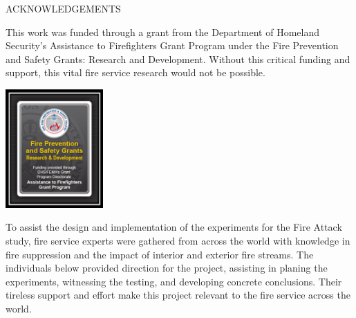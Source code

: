 \documentclass{article}
\begin{document}
\begin{center}
	ACKNOWLEDGEMENTS
\vspace*{\baselineskip}
\begin{adjustwidth}{-0.25in}{-0.25in}
This work was funded through a grant from the Department of Homeland Security's Assistance to Firefighters Grant Program under the Fire Prevention and Safety Grants: Research and Development. Without this critical funding and support, this vital fire service research would not be possible.

\vspace*{\baselineskip}

\begin{center}
	\includegraphics[width=0.28\textwidth]{Figures/General/DHS}
\end{center}

\clearpage

To assist the design and implementation of the experiments for the Fire Attack study, fire service experts were gathered from across the world with knowledge in fire suppression and the impact of interior and exterior fire streams. The individuals below provided direction for the project, assisting in planing the experiments, witnessing the testing, and developing concrete conclusions. Their tireless support and effort make this project relevant to the fire service across the world. 

\vspace*{\baselineskip}

\renewcommand{\arraystretch}{1.5}


\end{adjustwidth}
\end{center}
\end{document}
